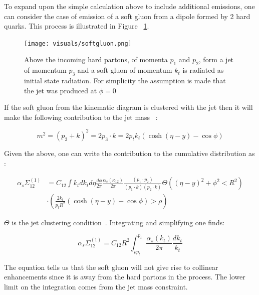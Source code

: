To expand upon the simple calculation above to include additional emissions, one can consider the case of emission of a soft gluon from a dipole formed by 2 hard quarks. This process is illustrated in Figure ~\ref{softgluon}.



\begin{figure}[htb]
\centering
\texttt{[image: visuals/softgluon.png]}
\caption{Above the incoming hard partons, of momenta $p_1$ and $p_2$, form a jet of momentum $p_3$ and a soft gluon of momentum $k_t$ is radiated as initial state radiation. For simplicity the assumption is made that the jet was produced at $\phi = 0$  }
\label{softgluon}
\end{figure}


If the soft gluon from the kinematic diagram is clustered with the jet then it will make the following contribution to the jet mass ~\cite{Marzani:2019hun}:\newline


\begin{equation}
m^{2}=\left(p_{3}+k\right)^{2}=2 p_{3} \cdot k=2 p_{t} k_{t}(\cosh (\eta-y)-\cos \phi)
\end{equation}

Given the above, one can write the contribution to the cumulative distribution as :\newline

\begin{equation}
\begin{aligned} \alpha_{s} \Sigma_{12}^{(1)} &=C_{12} \int k_{t} d k_{t} d \eta \frac{d \phi}{2 \pi} \frac{\alpha_{s}\left(\kappa_{12}\right)}{2 \pi} \frac{\left(p_{1} \cdot p_{2}\right)}{\left(p_{1} \cdot k\right)\left(p_{2} \cdot k\right)} \Theta\left((\eta-y)^{2}+\phi^{2}<R^{2}\right) \\ & \cdot\left(\frac{2 k_{t}}{p_{t} R^{2}}(\cosh (\eta-y)-\cos \phi)>\rho\right) \end{aligned}
\end{equation}

$\Theta$ is the jet clustering condition~\cite{Marzani:2019hun}. Integrating and simplifying one finds:\newline

\begin{equation}
\alpha_{s} \Sigma_{12}^{(1)}=C_{12} R^{2} \int_{\rho p_{t}}^{p_{t}} \frac{\alpha_{s}\left(k_{t}\right)}{2 \pi} \frac{d k_{t}}{k_{t}}
\end{equation}

The equation tells us that the soft gluon will not give rise to collinear enhancements since it is away from the hard partons in the process. The lower limit on the integration comes from the jet mass constraint.

